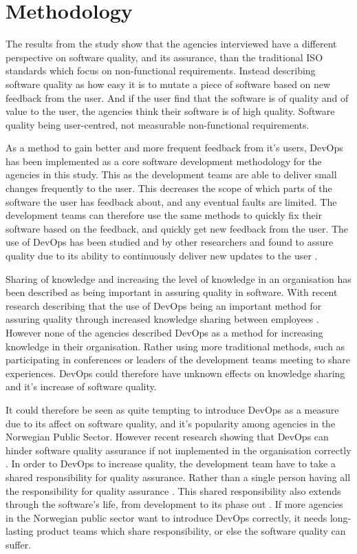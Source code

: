 \section{Methodology}
The results from the study show that the agencies interviewed have a different perspective on software quality, and its assurance, than the traditional ISO standards which focus on non-functional requirements. Instead describing software quality as how easy it is to mutate a piece of software based on new feedback from the user. And if the user find that the software is of quality and of value to the user, the agencies think their software is of high quality. Software quality being user-centred, not measurable non-functional requirements.

As a method to gain better and more frequent feedback from it's users, DevOps has been implemented as a core software development methodology for the agencies in this study. This as the development teams are able to deliver small changes frequently to the user. This decreases the scope of which parts of the software the user has feedback about, and any eventual faults are limited. The development teams can therefore use the same methods to quickly fix their software based on the feedback, and quickly get new feedback from the user. The use of DevOps has been studied and by other researchers and found to assure quality due to its ability to continuously deliver new updates to the user \cite{am_2020}\cite{smm_2018}\cite{ml_2022}.

Sharing of knowledge and increasing the level of knowledge in an organisation has been described as being important in assuring quality in software. With recent research describing that the use of DevOps being an important method for assuring quality through increased knowledge sharing between employees \cite{smm_2018}\cite{mm_2021}. However none of the agencies described DevOps as a method for increasing knowledge in their organisation. Rather using more traditional methods, such as participating in conferences or leaders of the development teams meeting to share experiences. DevOps could therefore have unknown effects on knowledge sharing and it's increase of software quality.

It could therefore be seen as quite tempting to introduce DevOps as a measure due to its affect on software quality, and it's popularity among agencies in the Norwegian Public Sector. However recent research showing that DevOps can hinder software quality assurance if not implemented in the organisation correctly \cite{dsc_2019}. In order to DevOps to increase quality, the development team have to take a shared responsibility for quality assurance. Rather than a single person having all the responsibility for quality assurance \cite{dsc_2019}. This shared responsibility also extends through the software's life, from development to its phase out \cite{dsc_2019}. If more agencies in the Norwegian public sector want to introduce DevOps correctly, it needs long-lasting product teams which share responsibility, or else the software quality can suffer.

